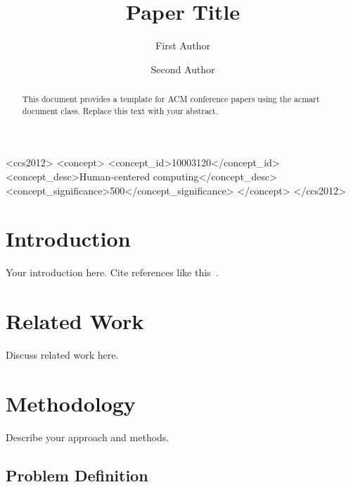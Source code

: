 \documentclass[sigconf,review]{acmart}
\begin{document}
\title{Paper Title}

\author{First Author}

\author{Second Author}

\begin{abstract}
    This document provides a template for ACM conference papers
    using the acmart document class. Replace this text with your abstract.
\end{abstract}

\begin{CCSXML}
<ccs2012>
<concept>
<concept_id>10003120</concept_id>
<concept_desc>Human-centered computing</concept_desc>
<concept_significance>500</concept_significance>
</concept>
</ccs2012>
\end{CCSXML}



\maketitle

\section{Introduction}

Your introduction here. Cite references like this~\cite{ref1}.

\section{Related Work}

Discuss related work here.

\section{Methodology}

Describe your approach and methods.

\subsection{Problem Definition}
\end{document}
